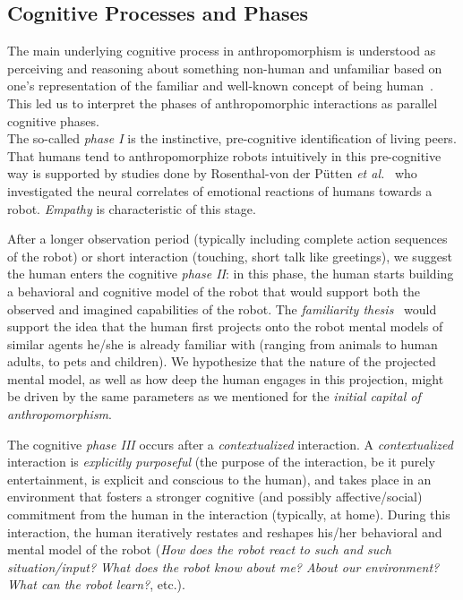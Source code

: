 \documentclass{sig-alternate-2013}
\begin{document}
\subsection*{Cognitive Processes and Phases}

The main underlying cognitive process in anthropomorphism is understood as
perceiving and reasoning about something non-human and unfamiliar based on
one's representation of the familiar and well-known concept of being
human~\cite{epley_when_2008}. This led us to interpret the phases of
anthropomorphic interactions as parallel cognitive phases.\\

The so-called \emph{phase I} is the instinctive, pre-cognitive identification of
living peers. That humans tend to anthropomorphize robots intuitively in this
pre-cognitive way
is supported by studies done by Rosenthal-von der Pütten
\textit{et al.}~\cite{rosenthal-vonderputten_experimental_2013} who investigated
the neural correlates of emotional reactions of humans towards a robot. {\it
Empathy} is characteristic of this stage.

After a longer observation period (typically including complete action sequences
of the robot) or short interaction (touching, short talk like greetings), we
suggest the human enters the cognitive \emph{phase II}: in this phase, the human
starts building a behavioral and cognitive model of the robot that would support
both the observed and imagined capabilities of the robot.  The \emph{familiarity
thesis}~\cite{hegel_understanding_2008} would support the idea that the human
first projects onto the robot mental models of similar agents he/she is already
familiar with (ranging from animals to human adults, to pets and children). We 
hypothesize that the nature of the projected mental
model, as well as how deep the human engages in this projection, might be
driven by the same parameters as we mentioned for the \emph{initial capital of
anthropomorphism}.

The cognitive \emph{phase III} occurs after a \emph{contextualized} interaction.
A \emph{contextualized} interaction is \emph{explicitly purposeful} (the purpose
of the interaction, be it purely entertainment, is explicit and conscious to the
human), and takes place in an environment that fosters a stronger cognitive (and
possibly affective/social) commitment from the human in the interaction
(typically, at home). During this interaction, the human iteratively restates
and reshapes his/her behavioral and mental model of the robot (\emph{How does
the robot react to such and such situation/input?  What does the robot know
about me? About our environment? What can the robot learn?}, etc.).\\
\end{document}
